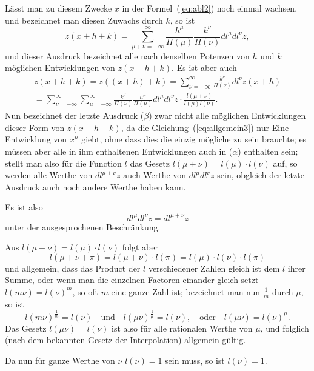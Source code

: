 \documentclass[12pt,a4paper]{article}
\begin{document}
L\"asst man zu diesem Zwecke $x$ in der Formel~(\ref{eq:abl2}) noch einmal wachsen, und bezeichnet man diesen Zuwachs durch $k$, so ist
\begin{equation}\tag{$\alpha$}
z(x+h+k) = \sum_{\mu+\nu=-\infty}^{\infty} \frac{h^\mu}{\Pi(\mu)} \frac{k^\nu}{\Pi(\nu)} dl^\mu dl^\nu z,
\end{equation}
und dieser Ausdruck bezeichnet alle nach denselben Potenzen von $h$ und $k$ m\"oglichen Entwicklungen von $z(x+h+k)$. Es ist aber auch
\begin{multline}\tag{$\beta$}
z(x+h+k) = z((x+h)+k) = \sum_{\nu=-\infty}^{\infty} \frac{k^\nu}{\Pi(\nu)} dl^\nu z(x+h) \\
= \sum_{\nu=-\infty}^{\infty} \sum_{\mu=-\infty}^{\infty} \frac{k^\nu}{\Pi(\nu)} \frac{h^\mu}{\Pi(\mu)} dl^\mu dl^\nu z \cdot \frac{l(\mu+\nu)}{l(\mu)l(\nu)}.
\end{multline}
Nun bezeichnet der letzte Ausdruck ($\beta$) zwar nicht alle m\"oglichen Entwicklungen dieser Form von $z(x+h+k)$, da die Gleichung~(\ref{eq:allgemein3}) nur Eine Entwicklung von $x^\mu$ giebt, ohne dass dies die einzig m\"ogliche zu sein brauchte; es m\"ussen aber alle in ihm enthaltenen Entwicklungen auch in ($\alpha$) enthalten sein; stellt man also f\"ur die Function $l$ das Gesetz $l(\mu+\nu) = l(\mu) \cdot l(\nu)$ auf, so werden alle Werthe von $dl^{\mu+\nu}z$ auch Werthe von $dl^\mu dl^\nu z$ sein, obgleich der letzte Ausdruck auch noch andere Werthe haben kann.

Es ist also
\begin{equation}
dl^\mu dl^\nu z = dl^{\mu+\nu} z
\end{equation}
unter der ausgesprochenen Beschr\"ankung.

Aus $l(\mu+\nu) = l(\mu) \cdot l(\nu)$ folgt aber
\[
l(\mu+\nu+\pi) = l(\mu+\nu) \cdot l(\pi) = l(\mu) \cdot l(\nu) \cdot l(\pi)
\]
und allgemein, dass das Product der $l$ verschiedener Zahlen gleich ist dem $l$ ihrer Summe, oder wenn man die einzelnen Factoren einander gleich setzt $l(m\nu) = l(\nu)^m$, so oft $m$ eine ganze Zahl ist; bezeichnet man nun $\frac{1}{m}$ durch $\mu$, so ist
\[
l(m\nu)^{\frac{1}{m}} = l(\nu) \quad \text{und} \quad l(\mu\nu)^{\frac{1}{\mu}} = l(\nu), \quad \text{oder} \quad l(\mu\nu) = l(\nu)^\mu.
\]
Das Gesetz $l(\mu\nu) = l(\nu)$ ist also f\"ur alle rationalen Werthe von $\mu$, und folglich (nach dem bekannten Gesetz der Interpolation) allgemein g\"ultig.

Da nun f\"ur ganze Werthe von $\nu$ $l(\nu) = 1$ sein muss, so ist $l(\nu) = 1$.
\end{document}
